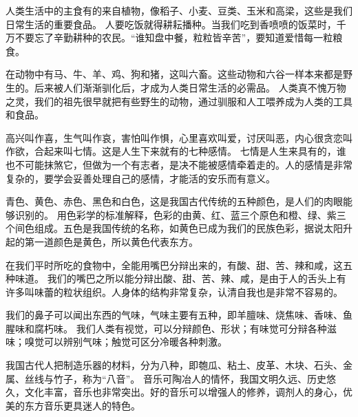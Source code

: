 \documentclass[avery5371,grid]{flashcards}
\begin{document}
{人类生活中的主食有的来自植物，像稻子、小麦、豆类、玉米和高梁，这些是我们日常生活的重要食品。} %
{人要吃饭就得耕耘播种。当我们吃到香喷喷的饭菜时，千万不要忘了辛勤耕种的农民。“谁知盘中餐，粒粒皆辛苦”，要知道爱惜每一粒粮食。} %

{在动物中有马、牛、羊、鸡、狗和猪，这叫六畜。这些动物和六谷一样本来都是野生的。后来被人们渐渐驯化后，才成为人类日常生活的必需品。} %
{人类真不愧万物之灵，我们的祖先很早就把有些野生的动物，通过驯服和人工喂养成为人类的工具和食品。} %

{高兴叫作喜，生气叫作哀，害怕叫作惧，心里喜欢叫爱，讨厌叫恶，内心很贪恋叫作欲，合起来叫七情。这是人生下来就有的七种感情。} %
{七情是人生来具有的，谁也不可能抹煞它，但做为一个有志者，是决不能被感情牵着走的。人的感情是非常复杂的，要学会妥善处理自己的感情，才能活的安乐而有意义。} %


{青色、黄色、赤色、黑色和白色，这是我国古代传统的五种颜色，是人们的肉眼能够识别的。} %
{用色彩学的标准解释，色彩的由黄、红、蓝三个原色和橙、绿、紫三个间色组成。五色是我国传统的名称，如黄色已成为我们的民族色彩，据说太阳升起的第一道颜色是黄色，所以黄色代表东方。} %

{在我们平时所吃的食物中，全能用嘴巴分辩出来的，有酸、甜、苦、辣和咸，这五种味道。} %
{我们的嘴巴之所以能分辩出酸、甜、苦、辣、咸，是由于人的舌头上有许多叫味蕾的粒状组织。人身体的结构非常复杂，认清自我也是非常不容易的。} %

{我们的鼻子可以闻出东西的气味，气味主要有五种，即羊膻味、烧焦味、香味、鱼腥味和腐朽味。} %
{我们人类有视觉，可以分辩颜色、形状；有味觉可分辩各种滋味；嗅觉可以辨别气味；触觉可区分冷暖各种刺激。} %


{我国古代人把制造乐器的材料，分为八种，即匏瓜、粘土、皮革、木块、石头、金属、丝线与竹子，称为“八音”。} %
{音乐可陶冶人的情怀，我国文明久远、历史悠久，文化丰富，音乐也非常突出。好的音乐可以增强人的修养，调剂人的身心，优美的东方音乐更具迷人的特色。} %
\end{document}

